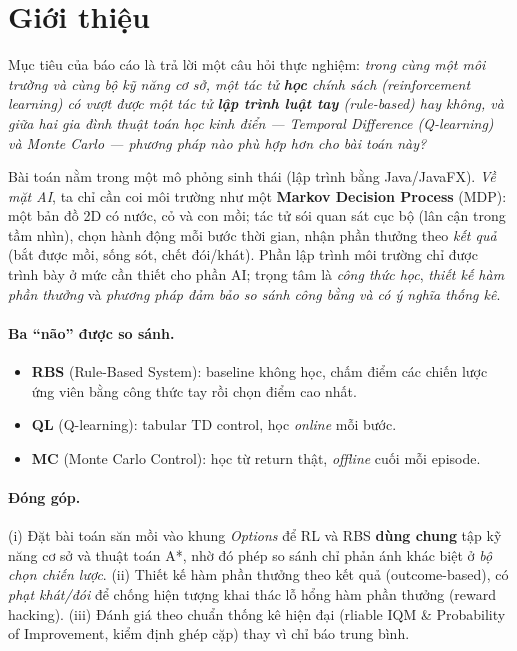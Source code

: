 \documentclass[11pt,a4paper]{article}
\begin{document}
\section{Giới thiệu}

Mục tiêu của báo cáo là trả lời một câu hỏi thực nghiệm: \emph{trong cùng một môi trường và cùng
bộ kỹ năng cơ sở, một tác tử \textbf{học} chính sách (reinforcement learning) có vượt được
một tác tử \textbf{lập trình luật tay} (rule-based) hay không, và giữa hai gia đình thuật toán
học kinh điển --- Temporal Difference (Q-learning) và Monte Carlo --- phương pháp nào phù hợp hơn
cho bài toán này?}

Bài toán nằm trong một mô phỏng sinh thái (lập trình bằng Java/JavaFX). \emph{Về mặt AI}, ta chỉ
cần coi môi trường như một \textbf{Markov Decision Process} (MDP): một bản đồ 2D có nước, cỏ và
con mồi; tác tử sói quan sát cục bộ (lân cận trong tầm nhìn), chọn hành động mỗi bước thời gian,
nhận phần thưởng theo \emph{kết quả} (bắt được mồi, sống sót, chết đói/khát). Phần lập trình môi
trường chỉ được trình bày ở mức cần thiết cho phần AI; trọng tâm là \emph{công thức học}, \emph{thiết
kế hàm phần thưởng} và \emph{phương pháp đảm bảo so sánh công bằng và có ý nghĩa thống kê}.

\paragraph{Ba ``não'' được so sánh.}
\begin{itemize}[leftmargin=1.4em]
  \item \textbf{RBS} (Rule-Based System): baseline không học, chấm điểm các chiến lược ứng viên
        bằng công thức tay rồi chọn điểm cao nhất.
  \item \textbf{QL} (Q-learning): tabular TD control, học \emph{online} mỗi bước.
  \item \textbf{MC} (Monte Carlo Control): học từ return thật, \emph{offline} cuối mỗi episode.
\end{itemize}

\paragraph{Đóng góp.}
(i) Đặt bài toán săn mồi vào khung \emph{Options} để RL và RBS \textbf{dùng chung} tập kỹ năng cơ
sở và thuật toán A*, nhờ đó phép so sánh chỉ phản ánh khác biệt ở \emph{bộ chọn chiến lược}. (ii)
Thiết kế hàm phần thưởng theo kết quả (outcome-based), có \emph{phạt khát/đói} để chống hiện tượng
khai thác lỗ hổng hàm phần thưởng (reward hacking). (iii) Đánh giá theo chuẩn thống kê
hiện đại (rliable IQM \& Probability of Improvement, kiểm định ghép cặp) thay vì chỉ báo trung
bình.
\end{document}
